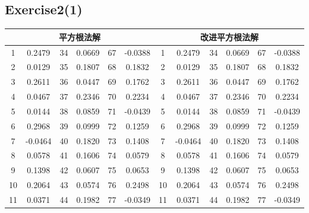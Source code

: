 \documentclass{article}
\begin{document}
\subsection*{Exercise2(1)}
\begin{table}[H]
	\centering
	\begin{tabular}{cccccccccccc}
		\toprule
		\multicolumn{6}{c}{\textbf{平方根法解}}                                           & \multicolumn{6}{c}{\textbf{改进平方根法解}}                                         \\
		\midrule
		1        & 0.2479        & 34            & 0.0669            & 67  & -0.0388 & 1        & 0.2479        & 34            & 0.0669            & 67  & -0.0388 \\
		2        & 0.0129        & 35            & 0.1807            & 68  & 0.1832  & 2        & 0.0129        & 35            & 0.1807            & 68  & 0.1832  \\
		3        & 0.2611        & 36            & 0.0447            & 69  & 0.1762  & 3        & 0.2611        & 36            & 0.0447            & 69  & 0.1762  \\
		4        & 0.0467        & 37            & 0.2346            & 70  & 0.2234  & 4        & 0.0467        & 37            & 0.2346            & 70  & 0.2234  \\
		5        & 0.0144        & 38            & 0.0859            & 71  & -0.0439 & 5        & 0.0144        & 38            & 0.0859            & 71  & -0.0439 \\
		6        & 0.2968        & 39            & 0.0999            & 72  & 0.1259  & 6        & 0.2968        & 39            & 0.0999            & 72  & 0.1259  \\
		7        & -0.0464       & 40            & 0.1820            & 73  & 0.1408  & 7        & -0.0464       & 40            & 0.1820            & 73  & 0.1408  \\
		8        & 0.0578        & 41            & 0.1606            & 74  & 0.0579  & 8        & 0.0578        & 41            & 0.1606            & 74  & 0.0579  \\
		9        & 0.1398        & 42            & 0.0607            & 75  & 0.0653  & 9        & 0.1398        & 42            & 0.0607            & 75  & 0.0653  \\
		10       & 0.2064        & 43            & 0.0574            & 76  & 0.2498  & 10       & 0.2064        & 43            & 0.0574            & 76  & 0.2498  \\
		11       & 0.0371        & 44            & 0.1982            & 77  & -0.0349 & 11       & 0.0371        & 44            & 0.1982            & 77  & -0.0349 \\

\end{tabular}
\end{table}
\end{document}
